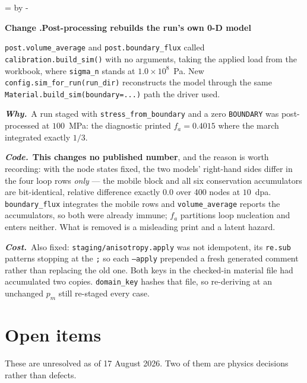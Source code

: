 \documentclass[11pt,a4paper]{article}
\newcommand{\code}[1]{\texttt{\small #1}}
\newcommand{\needlines}[1]{%
  \par\dimen0=\pagegoal \advance\dimen0 by -\pagetotal
  \ifdim\dimen0<#1\baselineskip \newpage \fi}
\newcounter{chg}
\newcommand{\change}[1]{%
  \needlines{4}%
  \refstepcounter{chg}%
  \par\medskip\noindent
  {\bfseries\boldmath Change \thechg.\quad #1}%
  \par\nobreak\smallskip}
\newcommand{\why}[1]{\par\noindent\textbf{\itshape Why.}\ #1\par}
\newcommand{\impact}[1]{\par\noindent\textbf{\itshape Code.}\ #1\par}
\newcommand{\cost}[1]{\par\noindent\textbf{\itshape Cost.}\ #1\par}
\begin{document}
\change{Post-processing rebuilds the run's own 0-D model}
\label{chg:sim-for-run}
\code{post.volume\_average} and \code{post.boundary\_flux} called
\code{calibration.build\_sim()} with no arguments, taking the applied load from
the workbook, where \code{sigma\_n} stands at $1.0\times10^8$~Pa. New
\code{config.sim\_for\_run(run\_dir)} reconstructs the model through the same
\code{Material.build\_sim(boundary=...)} path the driver used.
\why{A run staged with \code{stress\_from\_boundary} and a zero \code{BOUNDARY}
was post-processed at $100$~MPa: the diagnostic printed $f_a = 0.4015$ where the
march integrated exactly $1/3$.}
\impact{\textbf{This changes no published number}, and the reason is worth
recording: with the node states fixed, the two models' right-hand sides differ in
the four loop rows \emph{only} --- the mobile block and all six conservation
accumulators are bit-identical, relative difference exactly $0.0$ over 400 nodes
at $10$~dpa. \code{boundary\_flux} integrates the mobile rows and
\code{volume\_average} reports the accumulators, so both were already immune;
$f_a$ partitions loop nucleation and enters neither. What is removed is a
misleading print and a latent hazard.}
\cost{Also fixed: \code{staging/anisotropy.apply} was not idempotent, its
\code{re.sub} patterns stopping at the \code{;} so each \code{--apply} prepended a
fresh generated comment rather than replacing the old one. Both keys in the
checked-in material file had accumulated two copies. \code{domain\_key} hashes
that file, so re-deriving at an unchanged $p_m$ still re-staged every case.}

\part{Open items}
\label{part:open}

These are unresolved as of 17 August 2026. Two of them are physics decisions
rather than defects.
\end{document}
